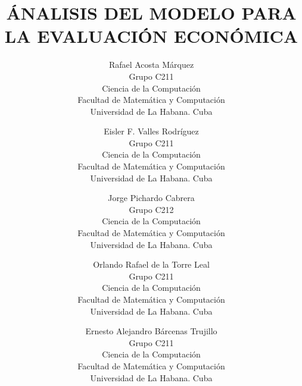 \documentclass{wscpaperproc}
\theoremstyle{wsc}
\begin{document}
%
%

\title{\'ANALISIS DEL MODELO PARA LA EVALUACI\'ON ECON\'OMICA}

\author{Rafael Acosta M\'arquez\\[12pt]
	Grupo C211\\
	Ciencia de la Computaci\'on\\
	Facultad de Matem\'atica y Computaci\'on\\
	Universidad de La Habana. Cuba\\
\and
Eisler F. Valles Rodr\'iguez\\[12pt]
Grupo C211\\
	Ciencia de la Computaci\'on\\
	Facultad de Matem\'atica y Computaci\'on\\
	Universidad de La Habana. Cuba\\
\and
Jorge Pichardo Cabrera\\[12pt]
Grupo C212\\
    Ciencia de la Computaci\'on\\
	Facultad de Matem\'atica y Computaci\'on\\
	Universidad de La Habana. Cuba\\
\and
Orlando Rafael de la Torre Leal\\[12pt]
Grupo C211\\
	Ciencia de la Computaci\'on\\
	Facultad de Matem\'atica y Computaci\'on\\
	Universidad de La Habana. Cuba\\
\and
Ernesto Alejandro B\'arcenas Trujillo\\[12pt]
Grupo C211\\
    Ciencia de la Computaci\'on\\
	Facultad de Matem\'atica y Computaci\'on\\
	Universidad de La Habana. Cuba\\
}
\end{document}
